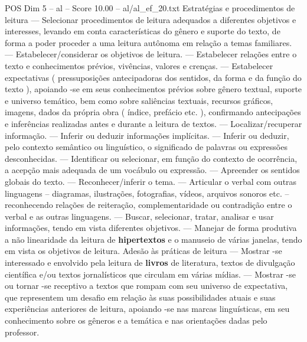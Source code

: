 \begin{textsample}{POS Dim 5 – al – Score 10.00 – al/al\_ef\_20.txt}
Estratégias e procedimentos de leitura — Selecionar procedimentos de leitura adequados a diferentes objetivos e interesses, levando em conta características do gênero e suporte do texto, de forma a poder proceder a uma leitura autônoma em relação a temas familiares. — Estabelecer/considerar os objetivos de leitura. — Estabelecer relações entre o texto e conhecimentos prévios, vivências, valores e crenças. — Estabelecer expectativas ( pressuposições antecipadoras dos sentidos, da forma e da função do texto ), apoiando -se em seus conhecimentos prévios sobre gênero textual, suporte e universo temático, bem como sobre saliências textuais, recursos gráficos, imagens, dados da própria obra ( índice, prefácio etc. ), confirmando antecipações e inferências realizadas antes e durante a leitura de textos. — Localizar/recuperar informação. — Inferir ou deduzir informações implícitas. — Inferir ou deduzir, pelo contexto semântico ou linguístico, o significado de palavras ou expressões desconhecidas. — Identificar ou selecionar, em função do contexto de ocorrência, a acepção mais adequada de um vocábulo ou expressão. — Apreender os sentidos globais do texto. — Reconhecer/inferir o tema. — Articular o verbal com outras linguagens – diagramas, ilustrações, fotografias, vídeos, arquivos sonoros etc. – reconhecendo relações de reiteração, complementaridade ou contradição entre o verbal e as outras linguagens. — Buscar, selecionar, tratar, analisar e usar informações, tendo em vista diferentes objetivos. — Manejar de forma produtiva a não linearidade da leitura de \textbf{hipertextos} e o manuseio de várias janelas, tendo em vista os objetivos de leitura.
Adesão às práticas de leitura — Mostrar -se interessado e envolvido pela leitura de \textbf{livros} de literatura, textos de divulgação científica e/ou textos jornalísticos que circulam em várias mídias. — Mostrar -se ou tornar -se receptivo a textos que rompam com seu universo de expectativa, que representem um desafio em relação às suas possibilidades atuais e suas experiências anteriores de leitura, apoiando -se nas marcas linguísticas, em seu conhecimento sobre os gêneros e a temática e nas orientações dadas pelo professor.

\end{textsample}
